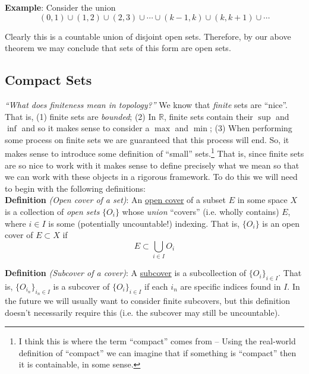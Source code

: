 \documentclass[12pt]{article}
\newlength\tindent
\renewcommand{\indent}{\hspace*{\tindent}}
\newcommand{\R}{\mathbb R}
\begin{document}
{\bf Example}: Consider the union
\begin{equation*}
	(0, 1) \cup (1, 2) \cup (2, 3) \cup \cdots \cup (k - 1, k) \cup (k, k + 1) \cup \cdots
\end{equation*}

\indent Clearly this is a countable union of disjoint open sets. Therefore, by our above theorem we may conclude that sets of this form are open sets. 

\subsection{Compact Sets}

{\em ``What does finiteness mean in topology?''} We know that {\em finite} sets are ``nice''. That is, (1) finite sets are {\em bounded}; (2) In $\R$, finite sets contain their $\sup$ and $\inf$ and so it makes sense to consider a $\max$ and $\min$; (3) When performing some process on finite sets we are guaranteed that this process will end. So, it makes sense to introduce some definition of ``small'' sets.\footnote{I think this is where the term ``compact'' comes from -- Using the real-world definition of ``compact'' we can imagine that if something is ``compact'' then it is containable, in some sense.} That is, since finite sets are so nice to work with it makes sense to define precisely what we mean so that we can work with these objects in a rigorous framework. To do this we will need to begin with the following definitions: \\

{\bf Definition} {\em (Open cover of a set)}: An \underline{open cover} of a subset $E$ in some space $X$ is a collection of {\em open sets} $\{O_i\}$ whose {\em union} ``covers'' (i.e. wholly contains) $E$, where $i \in I$ is some (potentially uncountable!) indexing. That is, $\{O_i\}$ is an open cover of $E \subset X$ if
\begin{equation*}
	E \subset \bigcup_{i \in I} O_i
\end{equation*}

{\bf Definition} {\em (Subcover of a cover)}: A \underline{subcover} is a subcollection of $\{O_i\}_{i \in I}$. That is, $\{O_{i_n}\}_{i_n \in I}$ is a subcover of $\{O_i\}_{i\in I}$ if each $i_n$ are specific indices found in $I$. In the future we will usually want to consider finite subcovers, but this definition doesn't necessarily require this (i.e. the subcover may still be uncountable). \\
\end{document}
